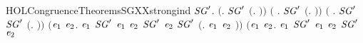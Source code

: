 \newcommand{\HOLCongruenceTheoremsSGXXSEQXXstrongXXinduction}{\UseVerbatim{HOLCongruenceTheoremsSGXXSEQXXstrongXXinduction}}
\begin{SaveVerbatim}{HOLCongruenceTheoremsSGXXstrongind}
\HOLTokenTurnstile{} \HOLSymConst{\HOLTokenForall{}}\ensuremath{\HOLBoundVar{SG}\sp{\prime}}.
       \ensuremath{(}\HOLSymConst{\HOLTokenForall{}}. \ensuremath{\HOLBoundVar{SG}\sp{\prime}} \ensuremath{(}\HOLTokenLambda{}. \ensuremath{)}\ensuremath{)} \HOLSymConst{\HOLTokenConj{}}
       \ensuremath{(}\HOLSymConst{\HOLTokenForall{}} .   \HOLSymConst{\HOLTokenImp{}} \ensuremath{\HOLBoundVar{SG}\sp{\prime}} \ensuremath{(}\HOLTokenLambda{}.  \HOLSymConst{\ensuremath{\ldotp}} \ensuremath{)}\ensuremath{)} \HOLSymConst{\HOLTokenConj{}}
       \ensuremath{(}\HOLSymConst{\HOLTokenForall{}} .   \HOLSymConst{\HOLTokenConj{}} \ensuremath{\HOLBoundVar{SG}\sp{\prime}}  \HOLSymConst{\HOLTokenImp{}} \ensuremath{\HOLBoundVar{SG}\sp{\prime}} \ensuremath{(}\HOLTokenLambda{}. \HOLSymConst{\ensuremath{\ldotp}} \ensuremath{)}\ensuremath{)} \HOLSymConst{\HOLTokenConj{}}
       \ensuremath{(}\HOLSymConst{\HOLTokenForall{}}\ensuremath{\HOLBoundVar{e}\sb{\mathrm{1}}} \ensuremath{\HOLBoundVar{e}\sb{\mathrm{2}}}.
             \ensuremath{\HOLBoundVar{e}\sb{\mathrm{1}}} \HOLSymConst{\HOLTokenConj{}} \ensuremath{\HOLBoundVar{SG}\sp{\prime}} \ensuremath{\HOLBoundVar{e}\sb{\mathrm{1}}} \HOLSymConst{\HOLTokenConj{}}  \ensuremath{\HOLBoundVar{e}\sb{\mathrm{2}}} \HOLSymConst{\HOLTokenConj{}} \ensuremath{\HOLBoundVar{SG}\sp{\prime}} \ensuremath{\HOLBoundVar{e}\sb{\mathrm{2}}} \HOLSymConst{\HOLTokenImp{}}
            \ensuremath{\HOLBoundVar{SG}\sp{\prime}} \ensuremath{(}\HOLTokenLambda{}. \ensuremath{\HOLBoundVar{e}\sb{\mathrm{1}}}  \HOLSymConst{\ensuremath{+}} \ensuremath{\HOLBoundVar{e}\sb{\mathrm{2}}} \ensuremath{)}\ensuremath{)} \HOLSymConst{\HOLTokenConj{}}
       \ensuremath{(}\HOLSymConst{\HOLTokenForall{}}\ensuremath{\HOLBoundVar{e}\sb{\mathrm{1}}} \ensuremath{\HOLBoundVar{e}\sb{\mathrm{2}}}.
             \ensuremath{\HOLBoundVar{e}\sb{\mathrm{1}}} \HOLSymConst{\HOLTokenConj{}} \ensuremath{\HOLBoundVar{SG}\sp{\prime}} \ensuremath{\HOLBoundVar{e}\sb{\mathrm{1}}} \HOLSymConst{\HOLTokenConj{}}  \ensuremath{\HOLBoundVar{e}\sb{\mathrm{2}}} \HOLSymConst{\HOLTokenConj{}} \ensuremath{\HOLBoundVar{SG}\sp{\prime}} \ensuremath{\HOLBoundVar{e}\sb{\mathrm{2}}} \HOLSymConst{\HOLTokenImp{}}

\end{SaveVerbatim}
